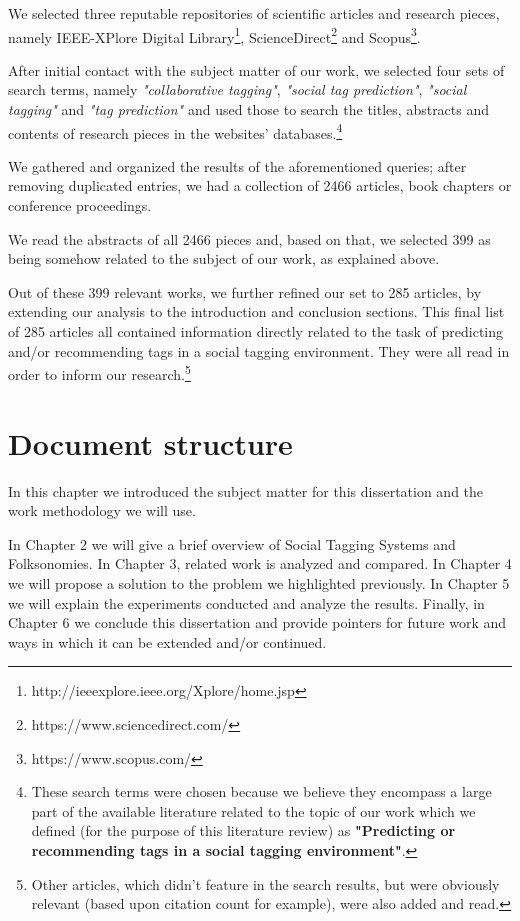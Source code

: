 We selected three reputable repositories of scientific articles and research pieces, namely IEEE-XPlore Digital Library\footnote{http://ieeexplore.ieee.org/Xplore/home.jsp}, ScienceDirect\footnote{https://www.sciencedirect.com/} and Scopus\footnote{https://www.scopus.com/}.

After initial contact with the subject matter of our work, we selected four sets of search terms, namely \textit{"collaborative tagging"}, \textit{"social tag prediction"}, \textit{"social tagging"} and \textit{"tag prediction"} and used those to search the titles, abstracts and contents of research pieces in the websites' databases.\footnote{These search terms were chosen because we believe they encompass a large part  of the available literature related to the topic of our work which we defined (for the purpose of this literature review) as \textbf{"Predicting or recommending tags in a social tagging environment"}.} 

We gathered and organized the results of the aforementioned queries; after removing duplicated entries, we had a collection of 2466 articles, book chapters or conference proceedings.

We read the abstracts of all 2466 pieces and, based on that, we selected 399 as being somehow related to the subject of our work, as explained above.

Out of these 399 relevant works, we further refined our set to 285 articles, by extending our analysis to the introduction and conclusion sections. This final list of 285 articles all contained information directly related to the task of predicting and/or recommending tags in a social tagging environment. They were all read in order to inform our research.\footnote{Other articles, which didn't feature in the search results, but were obviously relevant (based upon citation count for example), were also added and read.}


\section{Document structure}\label{section:intro_structure}

In this chapter we introduced the subject matter for this dissertation and the work methodology we will use.

In Chapter 2 we will give a brief overview of Social Tagging Systems and Folksonomies. In Chapter 3, related work is analyzed and compared. In Chapter 4 we will propose a solution to the problem we highlighted previously. In Chapter 5 we will explain the experiments conducted and analyze the results. Finally, in Chapter 6 we conclude this dissertation and provide pointers for future work and ways in which it can be extended and/or continued.



